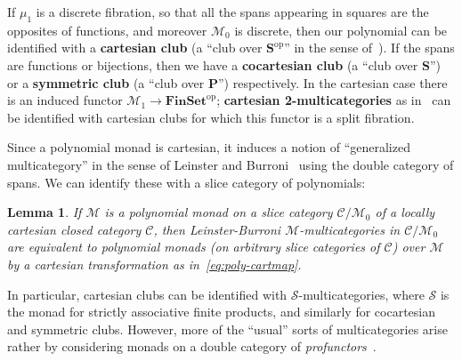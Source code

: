 \documentclass{article}
\newtheorem{lem}[thm]{Lemma}
\theoremstyle{definition}
\def\M{\mathcal{M}}
\def\sC{\mathscr{C}}
\begin{document}
If $\mu_1$ is a discrete fibration, so that all the spans appearing in squares are the opposites of functions, and moreover $\M_0$ is discrete, then our polynomial can be identified with a \textbf{cartesian club} (a ``club over $\mathbf{S}^{\mathrm{op}}$'' in the sense of~\cite{kelly:mv-funct-calc,kelly:abst-coh}).
If the spans are functions or bijections, then we have a \textbf{cocartesian club} (a ``club over $\mathbf{S}$'') or a \textbf{symmetric club} (a ``club over $\mathbf{P}$'') respectively.
In the cartesian case there is an induced functor $\M_1 \to \mathbf{FinSet}^{\mathrm{op}}$; \textbf{cartesian 2-multicategories} as in~\cite{lsr:multi} can be identified with cartesian clubs for which this functor is a split fibration.

Since a polynomial monad is cartesian, it induces a notion of ``generalized multicategory'' in the sense of Leinster and Burroni~\cite{leinster:higher-opds,burroni:t-cats} using the double category of spans.
We can identify these with a slice category of polynomials:

\begin{lem}\label{thm:poly-multi}
  If $\M$ is a polynomial monad on a slice category $\sC/\M_0$ of a locally cartesian closed category $\sC$, then Leinster-Burroni $\M$-multicategories in $\sC/\M_0$ are equivalent to polynomial monads (on arbitrary slice categories of $\sC$) over $\M$ by a cartesian transformation as in~\eqref{eq:poly-cartmap}.
\end{lem}

In particular, cartesian clubs can be identified with $\mathcal{S}$-multicategories, where $\mathcal{S}$ is the monad for strictly associative finite products, and similarly for cocartesian and symmetric clubs.
However, more of the ``usual'' sorts of multicategories arise rather by considering monads on a double category of \emph{profunctors}~\cite{cs:multicats}.
\end{document}
